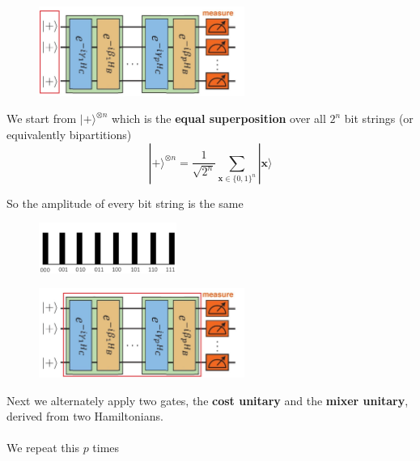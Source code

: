 \documentclass{beamer}
\renewcommand{\vec}[1]{\boldsymbol{#1}}
\begin{document}
{\begin{frame}[t]
	\begin{figure}[t]
		\includegraphics[width=0.6\textwidth]{figures/qaoa_idea_edit_1}
	\end{figure}
	We start from $|+\rangle^{\otimes n}$ which is the \textbf{equal superposition} over all $2^n$ bit strings (or equivalently bipartitions)
	\begin{equation}
	|+\rangle^{\otimes n} = \frac{1}{\sqrt{2^n}}\sum_{\vec{x} \in \{0,1\}^n}|\vec{x}\rangle
	\end{equation}
	
	\pause
	So the amplitude of every bit string is the same
	\begin{figure}
		\includegraphics[width=0.4\textwidth]{figures/superposition_carmina}
	\end{figure}
\end{frame}

\begin{frame}[t]
	\begin{figure}[t]
		\includegraphics[width=0.6\textwidth]{figures/qaoa_idea_edit_unitaries}
	\end{figure}
\vspace{20px}
Next we alternately apply two gates, the \textbf{cost unitary} and the \textbf{mixer unitary}, derived from two Hamiltonians. \\~\\
We repeat this $p$ times
\end{frame}

}
\end{document}
